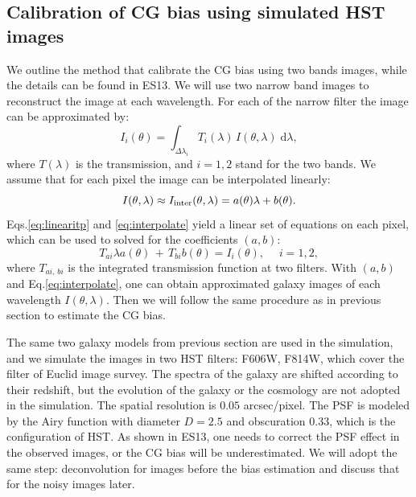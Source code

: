 \documentclass[useAMS,usenatbib]{mn2e}
\renewcommand{\d}{\mathrm{d}}
\newcommand{\be}{\begin{equation}}
\newcommand{\ee}{\end{equation}}
\def\elabel#1{\label{eq:#1}}
\begin{document}
\subsection{Calibration of CG bias using simulated HST images}

We outline the method that calibrate the CG bias using two bands
images, while the details can be found in ES13. We will use two narrow
band images to reconstruct the image at each wavelength. For each of
the narrow filter the image can be approximated by:
%
\be
I_i(\theta) = \int_{\Delta \lambda_i} T_i(\lambda)\, I(\theta,\lambda) \;\d \lambda,
\elabel{linearitp}
\ee
%
where $T(\lambda)$ is the transmission, and $i=1,2$ stand for the two bands.
We assume that for each pixel the image can be interpolated linearly:
%
\be
I(\theta,\lambda) \approx
I_{\rm inter}(\theta,\lambda)=a(\theta)\lambda + b(\theta).
\elabel{interpolate}
\ee
%
Eqs.\ref{eq:linearitp} and \ref{eq:interpolate} yield a linear set of
equations on each pixel, which can be used to solved for the
coefficients $(a,b)$:
%
\be
T_{ai} \lambda a(\theta) \,+\,T_{bi} b(\theta) = I_i(\theta), \quad\; i=1,2,
\elabel{lineareq}
\ee
%
where $T_{ai,\,bi}$ is the integrated transmission function at two
filters. With $(a,b)$ and Eq.\ref{eq:interpolate}, one can obtain
approximated galaxy images of each wavelength
$I(\theta,\lambda)$. Then we will follow the same procedure as in
previous section to estimate the CG bias.

The same two galaxy models from previous section are used in the
simulation, and we simulate the images in two HST filters: F606W,
F814W, which cover the filter of Euclid image survey. The spectra of
the galaxy are shifted according to their redshift, but the evolution
of the galaxy or the cosmology are not adopted in the simulation. The
spatial resolution is $0.05$ arcsec/pixel. The PSF is modeled by the
Airy function with diameter $D=2.5$ and obscuration $0.33$, which is
the configuration of HST. As shown in ES13, one needs to correct the
PSF effect in the observed images, or the CG bias will be
underestimated. We will adopt the same step: deconvolution for images
before the bias estimation and discuss that for the noisy images
later.
\end{document}
